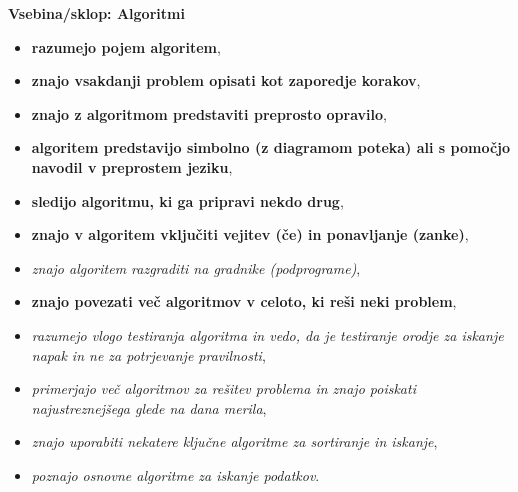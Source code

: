 \textbf{Vsebina/sklop: Algoritmi}
\begin{itemize}
\tightlist
\item \textbf{razumejo pojem algoritem},
\item \textbf{znajo vsakdanji problem opisati kot zaporedje korakov},
\item \textbf{znajo z algoritmom predstaviti preprosto opravilo},
\item \textbf{algoritem predstavijo simbolno (z diagramom poteka) ali s
  pomočjo navodil v preprostem jeziku},
\item \textbf{sledijo algoritmu, ki ga pripravi nekdo drug},
\item \textbf{znajo v algoritem vključiti vejitev (če) in ponavljanje (zanke)},
\item \emph{znajo algoritem razgraditi na gradnike (podprograme)},
\item \textbf{znajo povezati več algoritmov v celoto, ki reši neki problem},
\item \emph{razumejo vlogo testiranja algoritma in vedo, da je testiranje
  orodje za iskanje napak in ne za potrjevanje pravilnosti},
\item \emph{primerjajo več algoritmov za rešitev problema in znajo poiskati
  najustreznejšega glede na dana merila},
\item \emph{znajo uporabiti nekatere ključne algoritme za sortiranje in
  iskanje},
\item \emph{poznajo osnovne algoritme za iskanje podatkov}.
\end{itemize}

